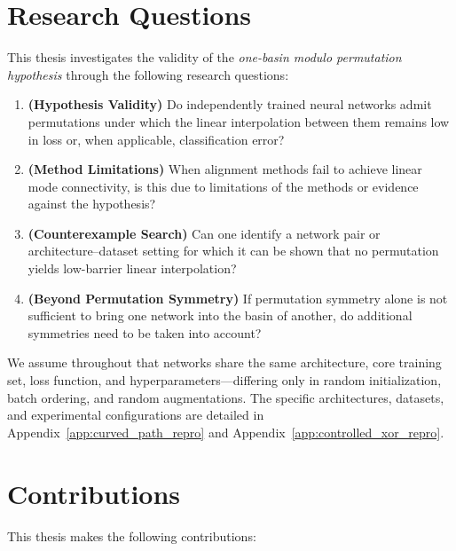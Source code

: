 \documentclass[11pt,a4paper]{report}
\begin{document}
\section{Research Questions}

This thesis investigates the validity of the \textit{one-basin modulo permutation hypothesis} through the following research questions:

\begin{enumerate}  
    \item[\textbf{RQ1}] \textbf{(Hypothesis Validity)} Do independently trained neural networks admit permutations under which the linear interpolation between them remains low in loss or, when applicable, classification error?

    \item[\textbf{RQ2}] \textbf{(Method Limitations)} When alignment methods fail to achieve linear mode connectivity, is this due to limitations of the methods or evidence against the hypothesis?

    \item[\textbf{RQ3}] \textbf{(Counterexample Search)} Can one identify a network pair or architecture--dataset setting for which it can be shown that no permutation yields low-barrier linear interpolation?

    \item[\textbf{RQ4}] \textbf{(Beyond Permutation Symmetry)} If permutation symmetry alone is not sufficient to bring one network into the basin of another, do additional symmetries need to be taken into account?
\end{enumerate}
\noindent We assume throughout that networks share the same architecture, core training set, loss function, and hyperparameters---differing only in random initialization, batch ordering, and random augmentations. The specific architectures, datasets, and experimental configurations are detailed in Appendix~\ref{app:curved_path_repro} and Appendix~\ref{app:controlled_xor_repro}.


\section{Contributions}

This thesis makes the following contributions:
\end{document}
